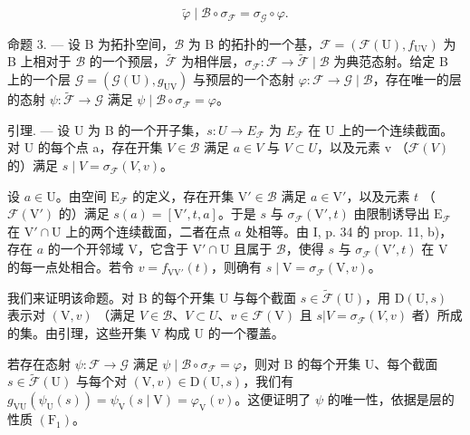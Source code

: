 \[
\widetilde {\varphi} \mid \mathcal {B} \circ \sigma_ {\mathcal {F}} = \sigma_ {\mathcal {G}} \circ \varphi .\tag{2}
\]

命题 3. --- 设 B 为拓扑空间，\(\mathcal{B}\) 为 B 的拓扑的一个基，\(\mathcal{F} = (\mathcal{F}(\mathrm{U}), f_{\mathrm{UV}})\) 为 B 上相对于 \(\mathcal{B}\) 的一个预层，\(\widetilde{\mathcal{F}}\) 为相伴层，\(\sigma_{\mathcal{F}}: \mathcal{F} \to \widetilde{\mathcal{F}} \mid \mathcal{B}\) 为典范态射。给定 B 上的一个层 \(\mathcal{G} = (\mathcal{G}(\mathrm{U}), g_{\mathrm{UV}})\) 与预层的一个态射 \(\varphi: \mathcal{F} \to \mathcal{G} \mid \mathcal{B}\)，存在唯一的层的态射 \(\psi: \widetilde{\mathcal{F}} \to \mathcal{G}\) 满足 \(\psi \mid \mathcal{B} \circ \sigma_{\mathcal{F}} = \varphi\)。

引理. --- 设 U 为 B 的一个开子集，\(s\colon U \to E_{\mathcal{F}}\) 为 \(E_{\mathcal{F}}\) 在 U 上的一个连续截面。对 U 的每个点 a，存在开集 \(V \in \mathcal{B}\) 满足 \(a \in V\) 与 \(V \subset U\)，以及元素 v （\(\mathcal{F}(V)\) 的）满足 \(s \mid V = \sigma_{\mathcal{F}}(V, v)\)。

设 \(a \in \mathrm{U}\)。由空间 \(\mathrm{E}_{\mathcal{F}}\) 的定义，存在开集 \(\mathrm{V}' \in \mathcal{B}\) 满足 \(a \in \mathrm{V}'\)，以及元素 \(t\) （\(\mathcal{F}(\mathrm{V}')\) 的）满足 \(s(a) = [\mathrm{V}', t, a]\)。于是 \(s\) 与 \(\sigma_{\mathcal{F}}(\mathrm{V}', t)\) 由限制诱导出 \(\mathrm{E}_{\mathcal{F}}\) 在 \(\mathrm{V}' \cap \mathrm{U}\) 上的两个连续截面，二者在点 \(a\) 处相等。由 I, p. 34 的 prop. 11, b)，存在 \(a\) 的一个开邻域 V，它含于 \(\mathrm{V}' \cap \mathrm{U}\) 且属于 \(\mathcal{B}\)，使得 \(s\) 与 \(\sigma_{\mathcal{F}}(\mathrm{V}', t)\) 在 V 的每一点处相合。若令 \(v = f_{\mathrm{VV}'}(t)\)，则确有 \(s \mid \mathrm{V} = \sigma_{\mathcal{F}}(\mathrm{V}, v)\)。

我们来证明该命题。对 B 的每个开集 U 与每个截面 \(s \in \widetilde{\mathcal{F}}(\mathrm{U})\)，用 \(\mathrm{D}(\mathrm{U}, s)\) 表示对 \((\mathrm{V}, v)\) （满足 \(V \in \mathcal{B}\)、\(V \subset U\)、\(v \in \mathcal{F}(\mathrm{V})\) 且 \(s | V = \sigma_{\mathcal{F}}(V, v)\) 者）所成的集。由引理，这些开集 V 构成 U 的一个覆盖。

若存在态射 \(\psi\colon\mathcal{F}\to\mathcal{G}\) 满足 \(\psi\mid\mathcal{B}\circ\sigma_{\mathcal{F}}=\varphi\)，则对 B 的每个开集 U、每个截面 \(s\in\widetilde{\mathcal{F}}(\mathrm{U})\) 与每个对 \((\mathrm{V},v)\in\mathrm{D}(\mathrm{U},s)\)，我们有 \(g_{\mathrm{VU}}(\psi_{\mathrm{U}}(s))=\psi_{\mathrm{V}}(s\mid\mathrm{V})=\varphi_{\mathrm{V}}(v)\)。这便证明了 \(\psi\) 的唯一性，依据是层的性质 \((\mathrm{F}_{1})\)。

